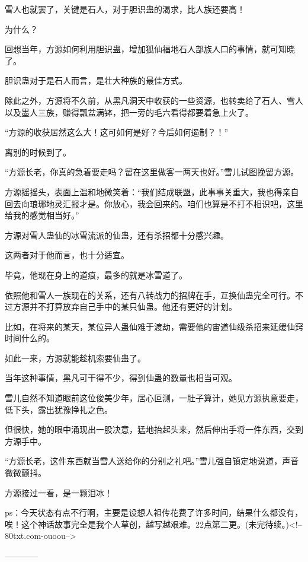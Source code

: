 \begin{this_body}
雪人也就罢了，关键是石人，对于胆识蛊的渴求，比人族还要高！

为什么？

回想当年，方源如何利用胆识蛊，增加狐仙福地石人部族人口的事情，就可知晓了。

胆识蛊对于是石人而言，是壮大种族的最佳方式。

除此之外，方源将不久前，从黑凡洞天中收获的一些资源，也转卖给了石人、雪人以及墨人三族，赚得瓢盆满钵，把一旁的毛六看得都要着急上火了。

“方源的收获居然这么大！这可如何是好？今后如何遏制？！”

离别的时候到了。

“方源长老，你真的急着要走吗？留在这里做客一两天也好。”雪儿试图挽留方源。

方源摇摇头，表面上温和地微笑着：“我们结成联盟，此事事关重大，我也得亲自回去向琅琊地灵汇报才是。你放心，我会回来的。咱们也算是不打不相识吧，这里给我的感觉相当好。”

方源对雪人蛊仙的冰雪流派的仙蛊，还有杀招都十分感兴趣。

这两者对于他而言，也十分适宜。

毕竟，他现在身上的道痕，最多的就是冰雪道了。

依照他和雪人一族现在的关系，还有八转战力的招牌在手，互换仙蛊完全可行。不过方源并不打算放弃自己手中的某只仙蛊。他还有更好的计划。

比如，在将来的某天，某位异人蛊仙难于渡劫，需要他的宙道仙级杀招来延缓仙窍时间什么的。

如此一来，方源就能趁机索要仙蛊了。

当年这种事情，黑凡可干得不少，得到仙蛊的数量也相当可观。

雪儿自然不知道眼前这位俊美少年，居心叵测，一肚子算计，她见方源执意要走，低下头，露出犹豫挣扎之色。

但很快，她的眼中涌现出一股决意，猛地抬起头来，然后伸出手将一件东西，交到方源手中。

“方源长老，这件东西就当雪人送给你的分别之礼吧。”雪儿强自镇定地说道，声音微微颤抖。

方源接过一看，是一颗泪冰！

ps：今天状态有点不行啊，主要是设想人祖传花费了许多时间，结果什么都没有，唉！这个神话故事完全是我个人草创，越写越艰难。22点第二更。(未完待续。)<!--80txt.com-ouoou-->

------------

\end{this_body}

